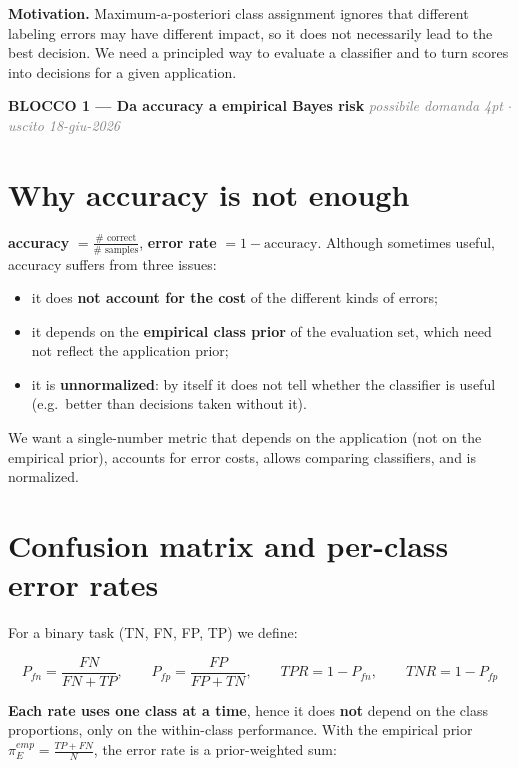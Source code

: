\textbf{Motivation.} Maximum-a-posteriori class assignment ignores that different labeling errors may have different impact, so it does not necessarily lead to the best decision. We need a principled way to evaluate a classifier and to turn scores into decisions for a given application.

\begin{tcolorbox}[colback=red!6, colframe=red!55!black, sharp corners, boxrule=1pt, left=2mm, right=2mm, top=1mm, bottom=1mm, enhanced, breakable]
\textbf{\textcolor{red!55!black}{BLOCCO 1 --- Da accuracy a empirical Bayes risk}} \hfill \textcolor{gray}{\footnotesize\textit{possibile domanda 4pt $\cdot$ uscito 18-giu-2026}}
\end{tcolorbox}

\section*{Why accuracy is not enough}

\textbf{accuracy} $= \frac{\#\text{ correct}}{\#\text{ samples}}$, \quad \textbf{error rate} $= 1 - \text{accuracy}$. Although sometimes useful, accuracy suffers from three issues:

\begin{itemize}
\item it does \textbf{not account for the cost} of the different kinds of errors;
\item it depends on the \textbf{empirical class prior} of the evaluation set, which need not reflect the application prior;
\item it is \textbf{unnormalized}: by itself it does not tell whether the classifier is useful (e.g.\ better than decisions taken without it).
\end{itemize}

We want a single-number metric that depends on the application (not on the empirical prior), accounts for error costs, allows comparing classifiers, and is normalized.

\section*{Confusion matrix and per-class error rates}

For a binary task (TN, FN, FP, TP) we define:

$$P_{fn} = \frac{FN}{FN+TP}, \qquad P_{fp} = \frac{FP}{FP+TN}, \qquad TPR = 1 - P_{fn}, \qquad TNR = 1 - P_{fp}$$

\textbf{Each rate uses one class at a time}, hence it does \textbf{not} depend on the class proportions, only on the within-class performance. With the empirical prior $\pi^{emp}_E = \frac{TP+FN}{N}$, the error rate is a prior-weighted sum:


